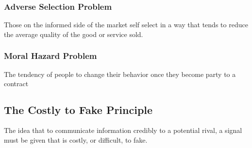 \subsubsection{Adverse Selection Problem}
Those on the informed side of the market self select in a way that tends to reduce the average quality of the good or service sold.

\subsubsection{Moral Hazard Problem}
The tendency of people to change their behavior once they become party to a contract

\subsection{The Costly to Fake Principle}
The idea that to communicate information credibly to a potential rival, a signal must be given that is costly, or difficult, to fake.